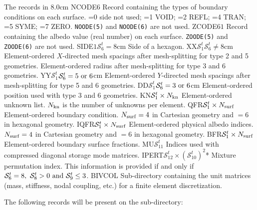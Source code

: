 \begin{DescriptionEnregistrement}{The  records in
}{8.0cm}
\IntEnr
  {NCODE}{$6$}
  {Record containing the types of boundary conditions on each surface. =0 side
   not used; =1 VOID; =2 REFL; =4 TRAN; =5 SYME; =7 ZERO. {\tt NOODE(5)} and
   {\tt NOODE(6)} are not used.} 
\RealEnr
  {ZCODE}{$6$}{$1$}
  {Record containing the albedo value (real number) on each surface. {\tt ZOODE(5)}
   and {\tt ZOODE(6)} are not used.} 
\OptRealEnr
  {SIDE}{$1$}{$\mathcal{S}^{t}_{6}=8$}{cm}
  {Side of a hexagon.} 
\OptRealEnr
  {XX}{$\mathcal{S}^{t}_{1}$}{$\mathcal{S}^{t}_{6}\ne 8$}{cm}
  {Element-ordered $X$-directed mesh spacings after mesh-splitting for type 2
   and 5 geometries. Element-ordered radius after mesh-splitting for type 3
   and 6 geometries.} 
\OptRealEnr
  {YY}{$\mathcal{S}^{t}_{1}$}{$\mathcal{S}^{t}_{6}=5 \ {\rm or} \ 6$}{cm}
  {Element-ordered $Y$-directed mesh spacings after mesh-splitting for type 5
   and 6 geometries.} 
\OptRealEnr
  {DD}{$\mathcal{S}^{t}_{1}$}{$\mathcal{S}^{t}_{6}=3 \ {\rm or} \ 6$}{cm}
  {Element-ordered position used with type 3 and 6 geometries.} 
\IntEnr
  {KN}{$\mathcal{S}^{t}_{1}\times N_{\rm kn}$}
  {Element-ordered unknown list. $N_{\rm kn}$ is the number of unknowns per element.} 
\RealEnr
  {QFR}{$\mathcal{S}^{t}_{1}\times N_{\rm surf}$}{}
  {Element-ordered boundary condition. $N_{\rm surf}=4$ in Cartesian geometry and $=6$ in hexagonal geometry.} 
\IntEnr
  {IQFR}{$\mathcal{S}^{t}_{1}\times N_{\rm surf}$}
  {Element-ordered physical albedo indices. $N_{\rm surf}=4$ in Cartesian geometry and $=6$ in hexagonal geometry.} 
\RealEnr
  {BFR}{$\mathcal{S}^{t}_{1}\times N_{\rm surf}$}{}
  {Element-ordered boundary surface fractions.} 
\IntEnr
  {MU}{$\mathcal{S}^{t}_{11}$}
  {Indices used with compressed diagonal storage mode matrices.} 
\OptIntEnr
  {IPERT}{$\mathcal{S}^{t}_{12}\times (\mathcal{S}^{t}_{10})^2$}{*}
  {Mixture permutation index. This information is provided if and only if $\mathcal{S}^{t}_{6}=8, \ \mathcal{S}^{t}_{8}>0 \ {\rm and} \
  \mathcal{S}^{t}_{9}\le 3$.} 
\DirEnr
  {BIVCOL}
  {Sub-directory containing the unit matrices (mass, stiffness, nodal coupling,
   etc.) for a finite element discretization.}
\end{DescriptionEnregistrement}

\goodbreak

The following records will be present on the  sub-directory:

